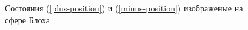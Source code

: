 \documentclass{beamer}
\begin{document}
\begin{frame}
\begin{figure}[h]
\begin{minipage}[h]{0.49\linewidth}
\end{minipage}
\hfill
\begin{minipage}[h]{0.49\linewidth}
\end{minipage}
\caption{Состояния (\ref{plus-position}) и (\ref{minus-position}) изображеные на сфере Блоха}
\label{ris:image1}
\end{figure}
\end{frame}
\end{document}
